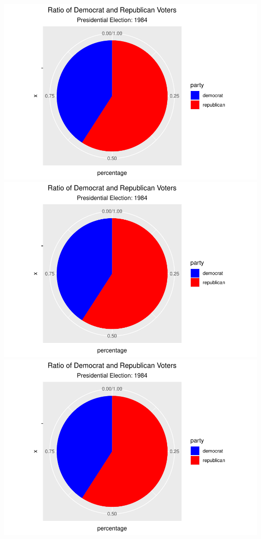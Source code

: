 \documentclass[
]{article}
\begin{document}
\includegraphics{election_files/figure-latex/anim-22.pdf}
\includegraphics{election_files/figure-latex/anim-23.pdf}
\includegraphics{election_files/figure-latex/anim-24.pdf}
\end{document}
